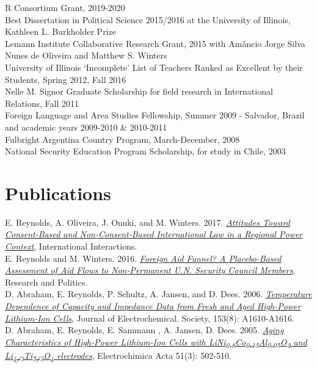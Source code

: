 \documentclass[margin, 10pt]{CVStyleTemplate}\usepackage[]{graphicx}\usepackage[dvipsnames]{xcolor}
\begin{document}
\begin{resume}
R Consortium Grant, 2019-2020\\[6pt]
Best Dissertation in Political Science 2015/2016 at the University of Illinois, Kathleen L. Burkholder Prize  \\[6pt]
Lemann Institute Collaborative Research Grant, 2015 with Am\^{a}ncio Jorge Silva Nunes de Oliveira and Matthew S. Winters\\[6pt]%
University of Illinois `Incomplete' List of Teachers Ranked as Excellent by their Students, Spring 2012, Fall 2016\\[6pt]%
Nelle M. Signor Graduate Scholarship for field research in International Relations, Fall 2011\\[6pt]%
Foreign Language and Area Studies Fellowship, Summer 2009 - Salvador, Brazil and academic years 2009-2010 \& 2010-2011\\[6pt]%
Fulbright Argentina Country Program, March-December, 2008\\[6pt]%
National Security Education Program Scholarship, for study in Chile, 2003\\[6pt]%

\section{Publications}

E. Reynolds, A. Oliveira, J. Onuki, and M. Winters. 2017. \emph{\href{http://www.tandfonline.com/doi/abs/10.1080/03050629.2018.1408012}{Attitudes Toward Consent-Based and Non-Consent-Based International Law in a Regional Power Context}}, International Interactions.\\[6pt]
E. Reynolds and M. Winters. 2016. \emph{\href{http://rap.sagepub.com/content/3/1/2053168015626167}{Foreign Aid Funnel? A Placebo-Based Assessment of Aid Flows to Non-Permanent U.N. Security Council Members}}, Research and Politics. \\[6pt]%
D. Abraham, E. Reynolds, P. Schultz, A. Jansen, and D. Dees. 2006. \emph{\href{http://jes.ecsdl.org/content/153/8/A1610.abstract}{Temperature Dependence of Capacity and Impedance Data from Fresh and Aged High-Power Lithium-Ion Cells}}, Journal of Electrochemical. Society, 153(8): A1610-A1616. \\[6pt]%
D. Abraham, E. Reynolds, E. Sammann , A. Jansen,  D. Dees. 2005. \emph{\href{http://www.sciencedirect.com/science/article/pii/S0013468605004433}{Aging Characteristics of High-Power Lithium-Ion Cells with LiNi\textsubscript{0.8}Co\textsubscript{0.15}Al\textsubscript{0.05}O\textsubscript{2} and Li\textsubscript{4/3}Ti\textsubscript{5/3}O\textsubscript{4} electrodes}}, Electrochimica Acta 51(3): 502-510.%


\end{resume}
\end{document}
